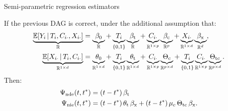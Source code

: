\documentclass[aspectratio=169]{beamer}
\theoremstyle{remark}
\begin{document}


%     



\begin{frame}{Semi-parametric regression estimators}

    If the previous DAG is correct, under the additional assumption that:
    \begin{equation*}
        \begin{aligned}
            \underbrace{\E[T_i, \C_{i \cdot}, \X_{i \cdot}]{Y_i}}_{\R}
             & = \underbrace{\betazero}_{\R}
            + \underbrace{T_i}_{\{0, 1\}} \underbrace{\betat}_{\R}
            + \underbrace{\C_{i \cdot}}_{\R^{1 \times p}} \underbrace{\betac}_{\R^{p}}
            + \underbrace{\X_{i \cdot}}_{\R^{1 \times d}} \underbrace{\betax}_{\R^d}, \\
            \underbrace{\E[T_i, \C_{i \cdot}]{\X_{i \cdot}}}_{\R^{1 \times d}}
             & = \underbrace{\thetazero}_{\R^{1 \times d}}
            + \underbrace{T_i}_{\{0, 1\}} \underbrace{\thetat}_{\R^{1 \times d}}
            + \underbrace{\C_{i \cdot}}_{\R^{1 \times p}} \underbrace{\Thetac}_{\R^{p \times d}}
            + \underbrace{T_i}_{\{0, 1\}} \underbrace{\C_{i \cdot}}_{\R^{1 \times p}} \underbrace{\Thetatc}_{\R^{p \times d}}.
        \end{aligned}
    \end{equation*}
    Then:
    \begin{align*}
        \ndef & = \paren*{t - t^*} \, \betat                                                        \\
        \nief & = \paren*{t - t^*} \, \thetat \, \betax + (t - t^*) \, \mu_c \, \Thetatc \, \betax.
    \end{align*}

\end{frame}



\end{document}
